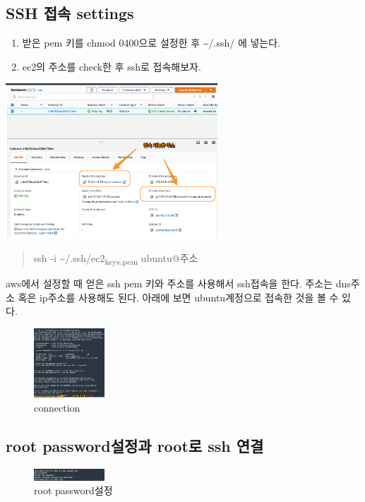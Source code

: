 \documentclass[11pt]{article}
\begin{document}
\subsection{SSH 접속 settings}
\label{sec:orgc6c0719}
\begin{enumerate}
\item 받은 pem 키를 chmod 0400으로 설정한 후 \textasciitilde{}/.ssh/ 에 넣는다.
\item ec2의 주소를 check한 후 ssh로 접속해보자.
\end{enumerate}
\begin{center}
\includegraphics[width=300px]{./img/ssh1.png}
\label{orge8d5af1}
\end{center}

\begin{quote}
ssh -i \textasciitilde{}/.ssh/ec2\textsubscript{keys.pem} ubuntu@주소
\end{quote}
aws에서 설정할 때 얻은 ssh pem 키와 주소를 사용해서 ssh접속을 한다. 주소는 dns주소 혹은 ip주소를 사용해도 된다. 아래에 보면 ubuntu계정으로 접속한 것을 볼 수 있다.
\begin{figure}[htbp]
\centering
\includegraphics[width=100px]{./img/connection.png}
\caption{\label{fig:org62e498d}connection}
\end{figure}

\subsection{root password설정과 root로 ssh 연결}
\label{sec:orga597807}
\begin{figure}[htbp]
\centering
\includegraphics[width=100px]{./img/root_pw.png}
\caption{\label{fig:org8d56246}root password설정}
\end{figure}
\end{document}
